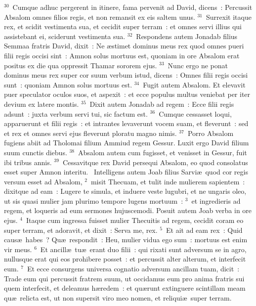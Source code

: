 ${}^{30}$~Cumque adhuc pergerent in itinere, fama pervenit ad David, dicens~: Percussit Absalom omnes filios regis, et non remansit ex eis saltem unus.
${}^{31}$~Surrexit itaque rex, et scidit vestimenta sua, et cecidit super terram~: et omnes servi illius qui assistebant ei, sciderunt vestimenta sua.
${}^{32}$~Respondens autem Jonadab filius Semmaa fratris David, dixit~: Ne \ae stimet dominus meus rex quod omnes pueri filii regis occisi sint~: Amnon solus mortuus est, quoniam in ore Absalom erat positus ex die qua oppressit Thamar sororem ejus.
${}^{33}$~Nunc ergo ne ponat dominus meus rex super cor suum verbum istud, dicens~: Omnes filii regis occisi sunt~: quoniam Amnon solus mortuus est.
${}^{34}$~Fugit autem Absalom. Et elevavit puer speculator oculos suos, et aspexit~: et ecce populus multus veniebat per iter devium ex latere montis.
${}^{35}$~Dixit autem Jonadab ad regem~: Ecce filii regis adsunt~: juxta verbum servi tui, sic factum est.
${}^{36}$~Cumque cessasset loqui, apparuerunt et filii regis~: et intrantes levaverunt vocem suam, et fleverunt~: sed et rex et omnes servi ejus fleverunt ploratu magno nimis.
${}^{37}$~Porro Absalom fugiens abiit ad Tholomai filium Ammiud regem Gessur. Luxit ergo David filium suum cunctis diebus.
${}^{38}$~Absalom autem cum fugisset, et venisset in Gessur, fuit ibi tribus annis.
${}^{39}$~Cessavitque rex David persequi Absalom, eo quod consolatus esset super Amnon interitu.
~Intelligens autem Joab filius Sarvi\ae\ quod cor regis versum esset ad Absalom,
${}^{2}$~misit Thecuam, et tulit inde mulierem sapientem~: dixitque ad eam~: Lugere te simula, et induere veste lugubri, et ne ungaris oleo, ut sis quasi mulier jam plurimo tempore lugens mortuum~:
${}^{3}$~et ingredieris ad regem, et loqueris ad eum sermones hujuscemodi. Posuit autem Joab verba in ore ejus.
${}^{4}$~Itaque cum ingressa fuisset mulier Thecuitis ad regem, cecidit coram eo super terram, et adoravit, et dixit~: Serva me, rex.
${}^{5}$~Et ait ad eam rex~: Quid caus\ae\ habes~? Qu\ae\ respondit~: Heu, mulier vidua ego sum~: mortuus est enim vir meus.
${}^{6}$~Et ancill\ae\ tu\ae\ erant duo filii~: qui rixati sunt adversum se in agro, nullusque erat qui eos prohibere posset~: et percussit alter alterum, et interfecit eum.
${}^{7}$~Et ecce consurgens universa cognatio adversum ancillam tuam, dicit~: Trade eum qui percussit fratrem suum, ut occidamus eum pro anima fratris sui quem interfecit, et deleamus h\ae redem~: et qu\ae runt extinguere scintillam meam qu\ae\ relicta est, ut non supersit viro meo nomen, et reliqui\ae\ super terram.
